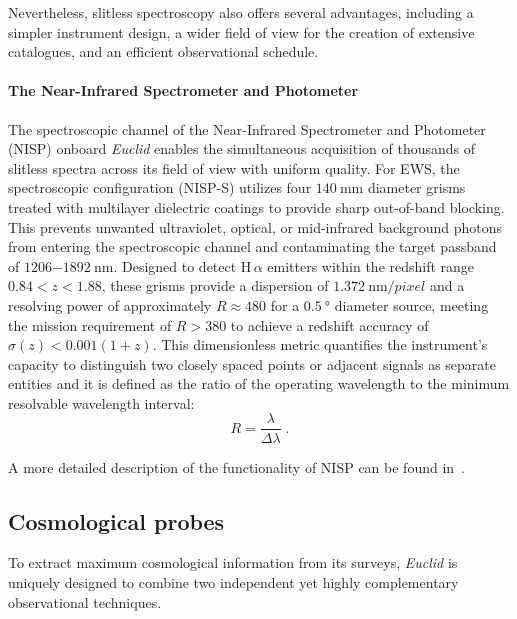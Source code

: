 \documentclass[12pt,a4paper,oneside]{report}
\begin{document}
Nevertheless, slitless spectroscopy also offers several advantages, including a simpler instrument design, a wider field of view for the creation of extensive catalogues, and an efficient observational schedule.

\paragraph{The Near-Infrared Spectrometer and Photometer}\label{parag:NISP}
The spectroscopic channel of the Near-Infrared Spectrometer and Photometer (NISP) onboard \textit{Euclid} enables the simultaneous acquisition of thousands of slitless spectra across its field of view with uniform quality. For EWS, the spectroscopic configuration (NISP-S) utilizes four $\SI{140}{\milli\meter}$ diameter grisms treated with multilayer dielectric coatings to provide sharp out-of-band blocking. This prevents unwanted ultraviolet, optical, or mid-infrared background photons from entering the spectroscopic channel and contaminating the target passband of $\num{1206}\mathrm{-}\SI{1892}{\nano\meter}$. Designed to detect $\mathrm{H}\,\alpha$ emitters within the redshift range $0.84 < z < 1.88$, these grisms provide a dispersion of $\SI{1.372}{\nano\meter/pixel}$ and a resolving power of approximately $R \approx 480$ for a $\SI{0.5}{\degree}$ diameter source, meeting the mission requirement of $R > 380$ to achieve a redshift accuracy of $\sigma(z) < 0.001(1 + z)$. This dimensionless metric quantifies the instrument's capacity to distinguish two closely spaced points or adjacent signals as separate entities and it is defined as the ratio of the operating wavelength to the minimum resolvable wavelength interval:
\begin{equation}
  R = \frac{\lambda}{\Delta\lambda} \; .
  \label{eq:ResolvingPower}
\end{equation}

A more detailed description of the functionality of NISP can be found in~\cite{SlitlessSpectroscopy}.

\subsection{Cosmological probes}\label{subsec:CosmologicalProbes}
To extract maximum cosmological information from its surveys, \textit{Euclid} is uniquely designed to combine two independent yet highly complementary observational techniques.
\end{document}
